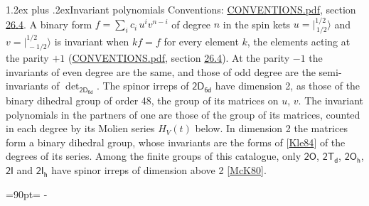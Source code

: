 \documentclass[10pt,a4paper]{article}
\makeatletter
\renewcommand\section{\@startsection{section}{1}{\z@}{-3ex plus -1ex minus -.2ex}%
  {1.2ex plus .2ex}{\normalfont\large\sffamily\bfseries\color{parttitle}}}
\newcommand{\needspace}[1]{\par\penalty-100\begingroup\dimen0=#1\relax\dimen2=\pagegoal
  \advance\dimen2-\pagetotal\ifdim\dimen0>\dimen2\relax\ifdim\dimen2>0pt\vfil\break\fi\fi
  \endgroup}
\numberwithin{equation}{section}
\newcommand{\grp}[1]{\mathsf{#1}}
\newcommand{\jm}[2]{\bigl\lvert{}^{#1}_{\,#2}\bigr\rangle}
\makeatother
\begin{document}
\section{Invariant polynomials}\label{s:invariants}
Conventions: \href{../../CONVENTIONS.pdf}{CONVENTIONS.pdf}, section \href{../../CONVENTIONS.pdf\#conv.26.4}{26.4}.
\leavevmode\label{n:local.binary.form}A binary form $f = \sum_i c_i\, u^i v^{n-i}$ of degree $n$ in the spin kets $u = \jm{1/2}{1/2}$ and $v = \jm{1/2}{-1/2}$ is invariant when $k f = f$ for every element $k$, the elements acting at the parity $+1$ (\href{../../CONVENTIONS.pdf}{CONVENTIONS.pdf}, section \href{../../CONVENTIONS.pdf\#conv.26.4}{26.4}). At the parity $-1$ the invariants of even degree are the same, and those of odd degree are the semi-invariants of $\det_{\grp{2D_{6d}}}$.
The spinor irreps of $\grp{2D_{6d}}$ have dimension 2, as those of the binary dihedral group of order 48, the group of its matrices on $u$, $v$. \label{n:function.hilbert}The invariant polynomials in the partners of one are those of the group of its matrices, counted in each degree by its Molien series $H_V(t)$ below. In dimension 2 the matrices form a binary dihedral group, whose invariants are the forms of [\href{../../../REFERENCES.pdf\#ref.Kle84}{Kle84}] of the degrees of its series. Among the finite groups of this catalogue, only $\grp{2O}$, $\grp{2T_{d}}$, $\grp{2O_{h}}$, $\grp{2I}$ and $\grp{2I_{h}}$ have spinor irreps of dimension above 2 [\href{../../../REFERENCES.pdf\#ref.McK80}{McK80}].
\needspace{90pt}
\end{document}
